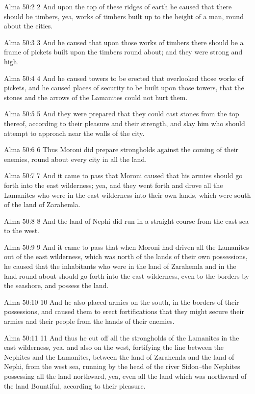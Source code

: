 Alma 50:2
 2 And upon the top of these ridges of earth he caused that there
should be timbers, yea, works of timbers built up to the height
of a man, round about the cities.

Alma 50:3
 3 And he caused that upon those works of timbers there should be
a frame of pickets built upon the timbers round about; and they
were strong and high.

Alma 50:4
 4 And he caused towers to be erected that overlooked those works
of pickets, and he caused places of security to be built upon
those towers, that the stones and the arrows of the Lamanites
could not hurt them.

Alma 50:5
 5 And they were prepared that they could cast stones from the
top thereof, according to their pleasure and their strength, and
slay him who should attempt to approach near the walls of the
city.

Alma 50:6
 6 Thus Moroni did prepare strongholds against the coming of
their enemies, round about every city in all the land.

Alma 50:7
 7 And it came to pass that Moroni caused that his armies should
go forth into the east wilderness; yea, and they went forth and
drove all the Lamanites who were in the east wilderness into
their own lands, which were south of the land of Zarahemla.

Alma 50:8
 8 And the land of Nephi did run in a straight course from the
east sea to the west.

Alma 50:9
 9 And it came to pass that when Moroni had driven all the
Lamanites out of the east wilderness, which was north of the
lands of their own possessions, he caused that the inhabitants
who were in the land of Zarahemla and in the land round about
should go forth into the east wilderness, even to the borders by
the seashore, and possess the land.

Alma 50:10
 10 And he also placed armies on the south, in the borders of
their possessions, and caused them to erect fortifications that
they might secure their armies and their people from the hands of
their enemies.

Alma 50:11
 11 And thus he cut off all the strongholds of the Lamanites in
the east wilderness, yea, and also on the west, fortifying the
line between the Nephites and the Lamanites, between the land of
Zarahemla and the land of Nephi, from the west sea, running by
the head of the river Sidon--the Nephites possessing all the land
northward, yea, even all the land which was northward of the land
Bountiful, according to their pleasure.

